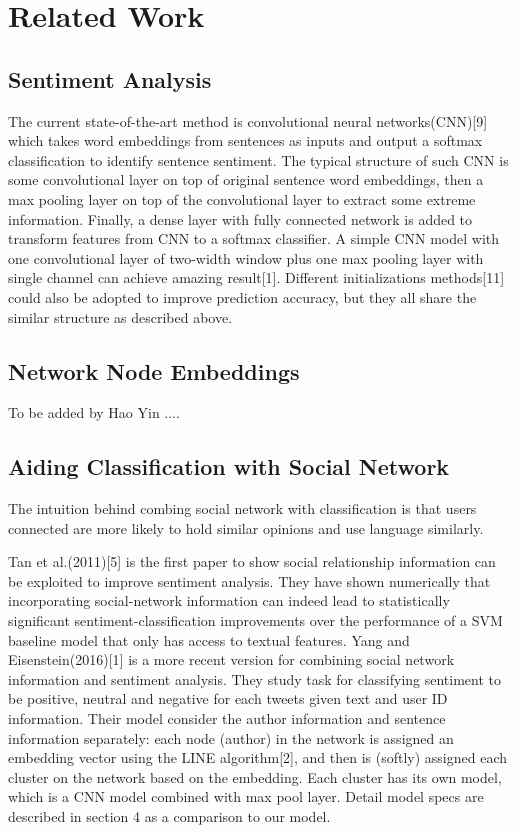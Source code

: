 \section{Related Work}

\subsection*{Sentiment Analysis}

The current state-of-the-art method is convolutional neural networks(CNN)[9] which takes word embeddings from sentences as inputs and output a softmax classification to identify sentence sentiment. The typical structure of such CNN is some convolutional layer on top of original sentence word embeddings, then a max pooling layer on top of the convolutional layer to extract some extreme information.  Finally, a dense layer with fully connected network is added to transform features from CNN to a softmax classifier. A simple CNN model with one convolutional layer of two-width window plus one max pooling layer with single channel can achieve amazing result[1]. Different initializations methods[11] could also be adopted to improve prediction accuracy, but they all share the similar structure as described above.


\subsection*{Network Node Embeddings}

To be added by Hao Yin ....


\subsection*{Aiding Classification with Social Network}

The intuition behind combing social network with classification is that users connected are more likely to hold similar opinions and use language similarly. 

Tan et al.(2011)[5] is the first paper to show social relationship information can be exploited to improve sentiment analysis. They have shown numerically that incorporating social-network information can indeed lead to statistically significant sentiment-classification improvements over the performance of a SVM baseline model that only has access to textual features. Yang and Eisenstein(2016)[1] is a more recent version for combining social network information and sentiment analysis. They study task for classifying sentiment to be positive, neutral and negative for each tweets given text and user ID information. Their model consider the author information and sentence information separately: each node (author) in the network is assigned an embedding vector using the LINE algorithm[2], and then is (softly) assigned each cluster on the network based on the embedding. Each cluster has its own model, which is a CNN model combined with max pool layer. Detail model specs are described in section 4 as a comparison to our model.

